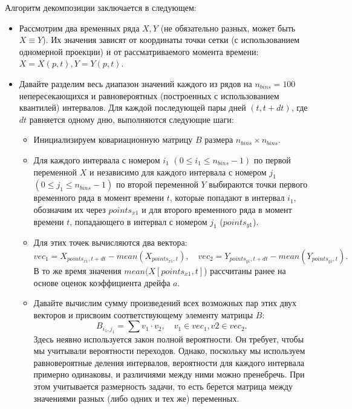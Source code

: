 Алгоритм декомпозиции заключается в следующем:
\begin{itemize}
	\item Рассмотрим два временных ряда $X,Y$ (не обязательно разных, может быть $X \equiv Y$). Их значения зависят от координаты точки сетки (с использованием одномерной проекции) и от рассматриваемого момента времени: $X=X(p,t), Y=Y(p,t)$. 
	\item Давайте разделим весь диапазон значений каждого из рядов на $n_{bins}=100$ непересекающихся и равновероятных (построенных с использованием квантилей) интервалов. Для каждой последующей пары дней $(t,t+dt)$, где $dt$ равняется одному дню, выполняются следующие шаги:
	\begin{itemize}
		\item Инициализируем ковариационную матрицу $B$ размера $n_{bins} \times n_{bins}$.
		
		\item Для каждого интервала с номером $i_1$ $(0 \leqslant i_1 \leqslant n_{bins}-1)$ по первой переменной $X$ и независимо для каждого интервала с номером $j_1$ $(0 \leqslant j_1 \leqslant n_{bins}-1)$ по второй переменной $Y$ выбираются точки первого временного ряда в момент времени $t$, которые попадают в интервал $i_1$, обозначим их через $points_{x1}$ и для второго временного ряда в момент времени $t$, попадающего в интервал с номером $j_1$ ($points_{y1}$).
		
		
		\item Для этих точек вычисляются два вектора:
		\begin{equation*}
			vec_1 = X_{points_{x1},t+dt} - mean(X_{points_{x1},t}),\quad
			vec_2 = Y_{points_{y1},t+dt} - mean(Y_{points_{y1},t}).
		\end{equation*}
		В то же время значения $mean(X[points_{x1},t]$) рассчитаны ранее на основе оценок коэффициента дрейфа $a$.
		
		\item Давайте вычислим сумму произведений всех возможных пар этих двух векторов и присвоим соответствующему элементу матрицы $B$:
		\begin{equation*}
			B_{i_1, j_1} = \sum v_1 \cdot v_2, \quad v_1 \in vec_1, v2 \in vec_2.
		\end{equation*}
		Здесь неявно используется закон полной вероятности. Он требует, чтобы мы учитывали вероятности переходов. Однако, поскольку мы используем равновероятные деления интервалов, вероятности для каждого интервала примерно одинаковы, и различиями между ними можно пренебречь. При этом учитывается размерность задачи, то есть берется матрица между значениями разных (либо одних и тех же) переменных.
		

\end{itemize}
\end{itemize}

